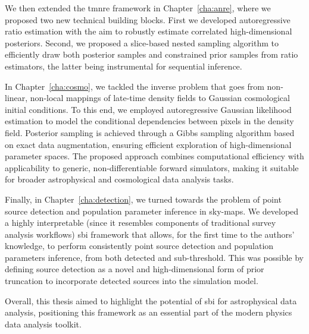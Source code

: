 We then extended the \gls*{tmnre} framework in Chapter~\ref{cha:anre}, where we proposed two new technical building blocks. First we developed autoregressive ratio estimation with the aim to robustly estimate correlated high-dimensional posteriors. Second, we proposed a slice-based nested sampling algorithm to efficiently draw both posterior samples and constrained prior samples from ratio estimators, the latter being instrumental for sequential inference.  

In Chapter~\ref{cha:cosmo}, we tackled the inverse problem that goes from non-linear, non-local mappings of late-time density fields to Gaussian cosmological initial conditions. To this end, we employed autoregressive Gaussian likelihood estimation to model the conditional dependencies between pixels in the density field. Posterior sampling is achieved through a Gibbs sampling algorithm based on exact data augmentation, ensuring efficient exploration of high-dimensional parameter spaces. The proposed approach combines computational efficiency with applicability to generic, non-differentiable forward simulators, making it suitable for broader astrophysical and cosmological data analysis tasks.

Finally, in Chapter~\ref{cha:detection}, we turned towards the problem of point source detection and population parameter inference in sky-maps. We developed a highly interpretable (since it resembles components of traditional survey analysis workflows) \gls*{sbi} framework that allows, for the first time to the authors' knowledge, to perform consistently point source detection and population parameters inference, from both detected and sub-threshold. This was possible by defining source detection as a novel and high-dimensional form of prior truncation to incorporate detected sources into the simulation model.

Overall, this thesis aimed to highlight the potential of \gls*{sbi} for astrophysical data analysis, positioning this framework as an essential part of the modern physics data analysis toolkit.
